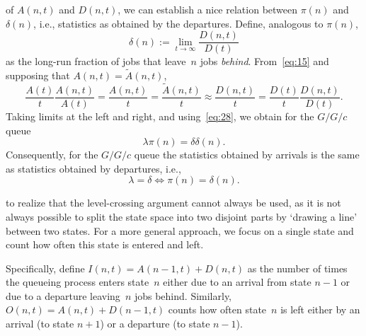 \documentclass[queueing-book.tex]{subfiles}
\begin{document}
 of $A(n,t)$ and $D(n,t)$, we can  establish a nice relation between $\pi(n)$ and $\delta(n)$, i.e.,  statistics as obtained by the departures. Define, analogous to $\pi(n)$,
\begin{equation*}
 \delta(n) := \lim_{t\to\infty} \frac{D(n,t)}{D(t)}
\end{equation*}
as the long-run fraction of jobs that leave~$n$ jobs \emph{behind}.
From~\cref{eq:15} and supposing that $A(n,t) = \tilde A(n,t)$,
\begin{equation*}
\frac{A(t)}t \frac{A(n,t)}{A(t)} = \frac{A(n,t)}t = \frac{\tilde A(n,t)}{t}\approx \frac{D(n,t)}t
= \frac{D(t)}t \frac{D(n,t)}{D(t)}.
\end{equation*}
Taking limits at the left and right, and using~\cref{eq:28}, we obtain for the $G/G/c$ queue
\begin{equation} \label{eq:36}
 \lambda \pi(n) = \delta \delta(n).
\end{equation}
Consequently, for the  $G/G/c$ queue  the statistics obtained by arrivals is the same as statistics obtained by departures, i.e.,
\begin{equation} \label{eq:39}
\lambda = \delta \iff \pi(n) = \delta(n).
\end{equation}


 to realize that the level-crossing argument cannot always be used, as it is not always possible to split the state space into two disjoint parts by `drawing a line' between two states.
For a more general approach, we focus on a single state and count how often this state is entered and left.
\begin{marginfigure}
\end{marginfigure}
Specifically, define $I(n,t) = A(n-1,t) + D(n,t)$ as the number of times the queueing process enters state~$n$ either due to an arrival from state $n-1$ or due to a departure leaving~$n$ jobs behind. Similarly,  $O(n,t) = A(n,t) + D(n-1,t)$ counts how often state~$n$ is left either by an arrival (to state $n+1$) or a departure (to state $n-1$).
\end{document}
